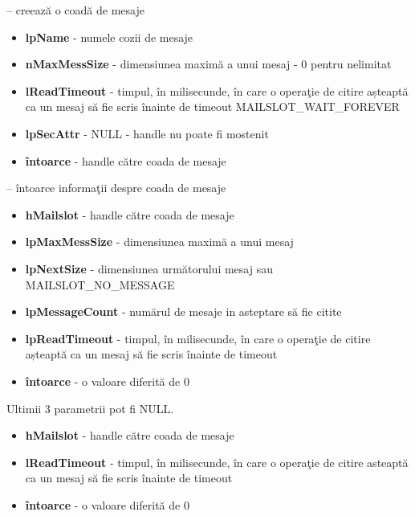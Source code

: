 \documentclass{refcard.cs.pub.ro}
\begin{document}
\begin{multicols*}{3}
 -- creează o coadă de mesaje
\begin{itemize}
  \item \textbf{lpName} -  numele cozii de mesaje
  \item \textbf{nMaxMessSize} - dimensiunea maximă a unui mesaj - 0 pentru nelimitat
  \item \textbf{lReadTimeout} - timpul, în milisecunde, în care o operaţie de citire așteaptă ca un mesaj să fie scris înainte de timeout
 MAILSLOT_WAIT_FOREVER
  \item \textbf{lpSecAttr} - NULL - handle nu poate fi mostenit
  \item \textbf{întoarce} - handle către coada de mesaje
\end{itemize}

 -- întoarce informaţii despre coada de mesaje
\begin{itemize}
  \item \textbf{hMailslot} - handle către coada de mesaje
  \item \textbf{lpMaxMessSize} - dimensiunea maximă a unui mesaj
  \item \textbf{lpNextSize} - dimensiunea următorului mesaj sau MAILSLOT_NO_MESSAGE
  \item \textbf{lpMessageCount} - numărul de mesaje in asteptare să fie citite
  \item \textbf{lpReadTimeout} - timpul, în milisecunde, în care o operaţie de citire așteaptă ca un mesaj să fie scris înainte de timeout
  \item \textbf{întoarce} - o valoare diferită de 0
\end{itemize}

\vspace*{-0.15cm}
Ultimii 3 parametrii pot fi NULL.

\begin{itemize}
  \item \textbf{hMailslot} - handle către coada de mesaje
  \item \textbf{lReadTimeout} - timpul, în milisecunde, în care o operaţie de citire asteaptă ca un mesaj să fie scris înainte de timeout
  \item \textbf{întoarce} - o valoare diferită de 0
\end{itemize}


\end{multicols*}
\end{document}
